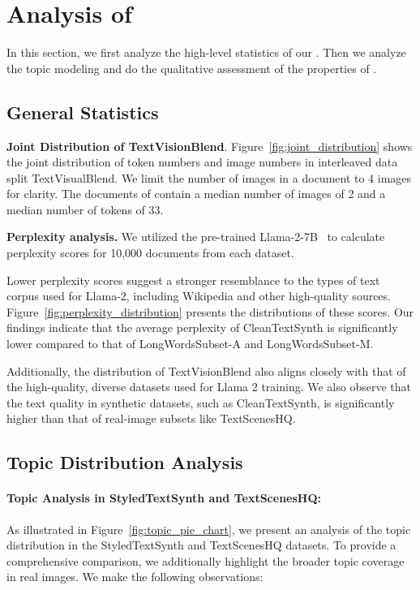 \section{Analysis of \DatasetName}
In this section, we first analyze the high-level statistics of our \DatasetName.
Then we analyze the topic modeling and do the qualitative assessment of the properties of \DatasetName.



\subsection{General Statistics}

\textbf{Joint Distribution of TextVisionBlend}. Figure~\ref{fig:joint_distribution} shows the joint distribution of token numbers and image numbers in interleaved data split TextVisualBlend. 
We limit the number of images in a document to 4 images for clarity. 
The documents of \DatasetName contain a median number of images of 2 and a median number of tokens of 33.






\textbf{Perplexity analysis.}
We utilized the pre-trained Llama-2-7B~\cite{llama2} to calculate perplexity scores for 10,000 documents from each dataset.

Lower perplexity scores suggest a stronger resemblance to the types of text corpus used for Llama-2, including Wikipedia and other high-quality sources.
Figure~\ref{fig:perplexity_distribution} presents the distributions of these scores.
Our findings indicate that the average perplexity of CleanTextSynth is significantly lower compared to that of LongWordsSubset-A and LongWordsSubset-M.

Additionally, the distribution of TextVisionBlend also aligns closely with that of the high-quality, diverse datasets used for Llama 2 training.
We also observe that the text quality in synthetic datasets, such as CleanTextSynth, is significantly higher than that of real-image subsets like TextScenesHQ.







\subsection{Topic Distribution Analysis}


\paragraph{Topic Analysis in StyledTextSynth and TextScenesHQ:}
As illustrated in Figure~\ref{fig:topic_pie_chart}, we present an analysis of the topic distribution in the StyledTextSynth and TextScenesHQ datasets.
To provide a comprehensive comparison, we additionally highlight the broader topic coverage in real images. 
We make the following observations:

